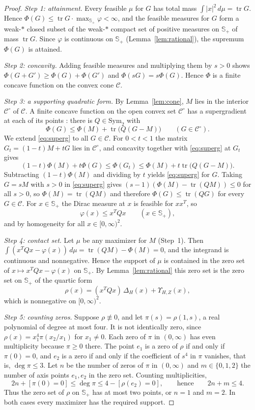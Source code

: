 \documentclass[11pt]{amsart}
\theoremstyle{definition}
\theoremstyle{remark}
\numberwithin{equation}{section}
\newcommand{\tr}{\operatorname{tr}}
\newcommand{\Sym}{\mathrm{Sym}_2}
\newcommand{\cC}{\mathcal{C}}
\newcommand{\Sp}{\mathbb{S}_+}
\begin{document}
\begin{proof}
\emph{Step 1: attainment.} Every feasible $\mu$ for $G$ has total mass $\int|x|^2\,d\mu=\tr G$. Hence $\Phi(G)\le\tr G\cdot\max_{\Sp}\varphi<\infty$, and the feasible measures for $G$ form a weak-$*$ closed subset of the weak-$*$ compact set of positive measures on $\Sp$ of mass $\tr G$. Since $\varphi$ is continuous on $\Sp$ (Lemma~\ref{lem:rational}), the supremum $\Phi(G)$ is attained.

\emph{Step 2: concavity.} Adding feasible measures and multiplying them by $s>0$ shows $\Phi(G+G')\ge\Phi(G)+\Phi(G')$ and $\Phi(sG)=s\Phi(G)$. Hence $\Phi$ is a finite concave function on the convex cone $\cC$.

\emph{Step 3: a supporting quadratic form.} By Lemma~\ref{lem:cone}, $M$ lies in the interior $\cC^\circ$ of $\cC$. A finite concave function on the open convex set $\cC^\circ$ has a supergradient at each of its points \cite[Theorem~23.4]{Roc70}: there is $Q\in\Sym$ with
\begin{equation}\label{eq:superg}
\Phi(G)\le\Phi(M)+\tr\bigl(Q(G-M)\bigr)\qquad(G\in\cC^\circ).
\end{equation}
We extend \eqref{eq:superg} to all $G\in\cC$. For $0<t<1$ the matrix $G_t=(1-t)M+tG$ lies in $\cC^\circ$, and concavity together with \eqref{eq:superg} at $G_t$ gives
\[
(1-t)\Phi(M)+t\Phi(G)\le\Phi(G_t)\le\Phi(M)+t\tr\bigl(Q(G-M)\bigr).
\]
Subtracting $(1-t)\Phi(M)$ and dividing by $t$ yields \eqref{eq:superg} for $G$. Taking $G=sM$ with $s>0$ in \eqref{eq:superg} gives $(s-1)(\Phi(M)-\tr(QM))\le0$ for all $s>0$, so $\Phi(M)=\tr(QM)$ and therefore $\Phi(G)\le\tr(QG)$ for every $G\in\cC$. For $x\in\Sp$ the Dirac measure at $x$ is feasible for $xx^T$, so
\begin{equation}\label{eq:majorant}
\varphi(x)\le x^TQx\qquad(x\in\Sp),
\end{equation}
and by homogeneity for all $x\in[0,\infty)^2$.

\emph{Step 4: contact set.} Let $\mu$ be any maximizer for $M$ (Step~1). Then $\int(x^TQx-\varphi(x))\,d\mu=\tr(QM)-\Phi(M)=0$, and the integrand is continuous and nonnegative. Hence the support of $\mu$ is contained in the zero set of $x\mapsto x^TQx-\varphi(x)$ on $\Sp$. By Lemma~\ref{lem:rational} this zero set is the zero set on $\Sp$ of the quartic form
\[
\rho(x)=(x^TQx)\,\Delta_H(x)+\Upsilon_{H,Z}(x),
\]
which is nonnegative on $[0,\infty)^2$.

\emph{Step 5: counting zeros.} Suppose $\rho\not\equiv0$, and let $\pi(s)=\rho(1,s)$, a real polynomial of degree at most four. It is not identically zero, since $\rho(x)=x_1^4\pi(x_2/x_1)$ for $x_1\ne0$. Each zero of $\pi$ in $(0,\infty)$ has even multiplicity because $\pi\ge0$ there. The point $e_1$ is a zero of $\rho$ if and only if $\pi(0)=0$, and $e_2$ is a zero if and only if the coefficient of $s^4$ in $\pi$ vanishes, that is, $\deg\pi\le3$. Let $n$ be the number of zeros of $\pi$ in $(0,\infty)$ and $m\in\{0,1,2\}$ the number of axis points $e_1,e_2$ in the zero set. Counting multiplicities,
\[
2n+[\pi(0)=0]\le\deg\pi\le4-[\rho(e_2)=0],\qquad\text{hence}\qquad 2n+m\le4 .
\]
Thus the zero set of $\rho$ on $\Sp$ has at most two points, or $n=1$ and $m=2$. In both cases every maximizer has the required support.


\end{proof}
\end{document}
